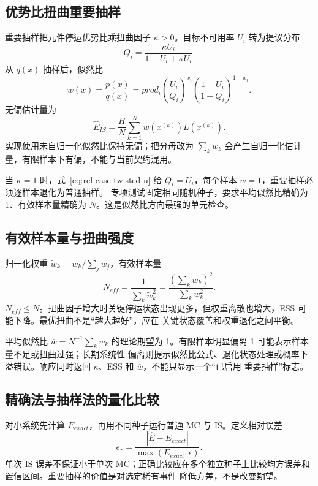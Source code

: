 \subsection{优势比扭曲重要抽样}
重要抽样把元件停运优势比乘扭曲因子 $\kappa>0$。目标不可用率 $U_i$ 转为提议分布
\begin{equation}\label{eq:rel-case-twisted-u}
 Q_i=\frac{\kappa U_i}{1-U_i+\kappa U_i}.
\end{equation}
从 $q(x)$ 抽样后，似然比
\begin{equation}
 w(x)=\frac{p(x)}{q(x)}=prod_i
 \left(\frac{U_i}{Q_i}\right)^{x_i}
 \left(\frac{1-U_i}{1-Q_i}\right)^{1-x_i}.
\end{equation}
无偏估计量为
\begin{equation}
 \widehat E_{IS}=\frac{H}{N}\sum_{k=1}^Nw(x^{(k)})L(x^{(k)}).
\end{equation}
实现使用未自归一化似然比保持无偏；把分母改为 $\sum_kw_k$ 会产生自归一化估计量，有限样本下有偏，不能与当前契约混用。

当 $\kappa=1$ 时，式~\eqref{eq:rel-case-twisted-u} 给 $Q_i=U_i$，每个样本 $w=1$，重要抽样必须逐样本退化为普通抽样。
专项测试固定相同随机种子，要求平均似然比精确为 1、有效样本量精确为 $N$。这是似然比方向最强的单元检查。

\subsection{有效样本量与扭曲强度}
归一化权重 $\widetilde w_k=w_k/\sum_jw_j$，有效样本量
\begin{equation}
 N_{eff}=\frac{1}{\sum_k\widetilde w_k^2}
 =\frac{(\sum_kw_k)^2}{\sum_kw_k^2}.
\end{equation}
$N_{eff}\le N$。扭曲因子增大时关键停运状态出现更多，但权重离散也增大，ESS 可能下降。最优扭曲不是“越大越好”，应在
关键状态覆盖和权重退化之间平衡。

平均似然比 $\overline w=N^{-1}\sum_kw_k$ 的理论期望为 1。有限样本明显偏离 1 可能表示样本量不足或扭曲过强；长期系统性
偏离则提示似然比公式、退化状态处理或概率下溢错误。响应同时返回 $\kappa$、ESS 和 $\overline w$，不能只显示一个“已启用
重要抽样”标志。

\subsection{精确法与抽样法的量化比较}
对小系统先计算 $E_{exact}$，再用不同种子运行普通 MC 与 IS。定义相对误差
\begin{equation}
 e_r=\frac{|\widehat E-E_{exact}|}{\max(E_{exact},\epsilon)}.
\end{equation}
单次 IS 误差不保证小于单次 MC；正确比较应在多个独立种子上比较均方误差和置信区间。重要抽样的价值是对选定稀有事件
降低方差，不是改变期望。

